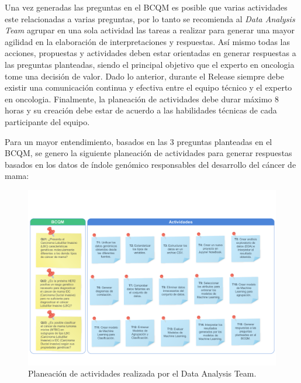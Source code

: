  Una vez generadas las preguntas en el BCQM es posible que varias actividades este relacionadas a varias preguntas, por lo tanto se recomienda al \textit{Data Analysis Team} agrupar en una sola actividad las tareas a realizar para generar una mayor agilidad en la elaboración de interpretaciones y respuestas. Así mismo todas las acciones, propuestas y actividades deben estar orientadas en generar respuestas a las preguntas planteadas, siendo el principal objetivo que el experto en oncologia tome una decisión de valor. Dado lo anterior, durante el Release siempre debe existir una comunicación continua y efectiva entre el equipo técnico y el experto en oncologia. Finalmente, la planeación de actividades debe durar máximo 8 horas y su creación debe estar de acuerdo a las habilidades técnicas de cada participante del equipo.
 
Para un mayor entendimiento, basados en las 3 preguntas planteadas en el BCQM, se genero la siguiente planeación de actividades para generar respuestas basados en los datos de índole genómico responsables del desarrollo del cáncer de mama:
\begin{figure}[!htb]
	\centering
	\includegraphics[width=
	\linewidth]{IMAGENES/Planning_TCGA}
	\caption{Planeación de actividades realizada por el Data Analysis Team. }
	\label{Activity_Planning_TCGA}
\end{figure}
